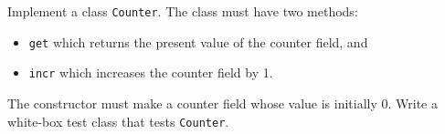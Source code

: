 Implement a class \lstinline{Counter}. The class must have two methods:
\begin{itemize}
\item \lstinline{get} which returns the present value of the counter field, and
\item \lstinline{incr} which increases the counter field by 1.
\end{itemize}
The constructor must make a counter field whose value is initially 0.
Write a white-box test class that tests \lstinline{Counter}.
